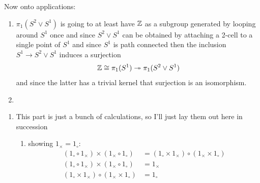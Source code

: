 \documentclass{article}
\begin{document}
\begin{homeworkProblem}
\begin{enumerate}[label=1.1.\arabic*]
        Now onto applications:
        \begin{enumerate}
            \item $\pi_1(S^2 \vee S^1)$ is going to at least have $\mathbb{Z}$ as a subgroup generated by looping around $S^1$ once and since $S^2 \vee S^1$ can be obtained by attaching a 2-cell to a single point of $S^1$ and since $S^1$ is path connected then the inclusion $S^1 \to S^2 \vee S^1$ induces a surjection
            \[\mathbb{Z} \cong \pi_1(S^1) \twoheadrightarrow \pi_1(S^2 \vee S^1)\]
            and since the latter has a trivial kernel that surjection is an isomorphism.
            \item 
        \end{enumerate}
    \end{enumerate}
\end{homeworkProblem}
\begin{homeworkProblem}
    \begin{enumerate}
        \item This part is just a bunch of calculations, so I'll just lay them out here in succession
        \begin{enumerate}[label=\roman*.]
            \item showing \(1_\times = 1_\circ\):
            \begin{align*}
                (1_\circ \circ 1_\times) \times (1_\times \circ 1_\circ) &= (1_\circ \times 1_\times) \circ (1_\times \times 1_\circ) \\
                (1_\circ \circ 1_\times) \times (1_\times \circ 1_\circ) &= 1_\times \\
                (1_\circ \times 1_\times) \circ (1_\times \times 1_\circ) &= 1_\circ 
            \end{align*}


\end{enumerate}
\end{enumerate}
\end{homeworkProblem}
\end{document}
